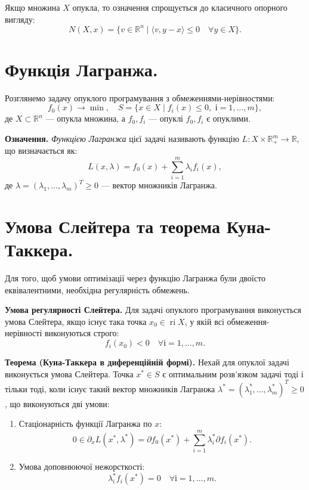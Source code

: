 \documentclass[12pt,a4paper]{extarticle}
\numberwithin{section}{part}
\begin{document}
Якщо множина $X$ опукла, то означення спрощується до класичного опорного вигляду:
$$
N(X, x) = \{ v \in \mathbb{R}^n \mid \langle v, y - x \rangle \leq 0 \quad \forall y \in X \}.
$$

\section{Функція Лагранжа.}
Розглянемо задачу опуклого програмування з обмеженнями-нерівностями:
$$
f_0(x) \to \min, \quad S = \{ x \in X \mid f_i(x) \leq 0,\,\, і = 1, \dots, m \},
$$
де $X \subset \mathbb{R}^n$ --- опукла множина, а $f_0, f_i$ --- опуклі $f_0, f_i$ є опуклими.

\textbf{Означення.} \textit{Функцією Лагранжа} цієї задачі називають функцію $L: X \times \mathbb{R}_+^m \to \mathbb{R}$, що визначається як:
$$
L(x, \lambda) = f_0(x) + \sum_{i=1}^m \lambda_i f_i(x),
$$
де $\lambda = (\lambda_1, \dots, \lambda_m)^T \geq 0$ --- вектор множників Лагранжа.

\section{Умова Слейтера та теорема Куна-Таккера.}
Для того, щоб умови оптимізації через функцію Лагранжа були двоїсто еквівалентними, необхідна регулярність обмежень.

\textbf{Умова регулярності Слейтера.} Для задачі опуклого програмування виконується умова Слейтера, якщо існує така точка $x_0 \in \operatorname{ri} X$, у якій всі обмеження-нерівності виконуються строго:
$$
f_i(x_0) < 0 \quad \forall і = 1, \dots, m.
$$

\textbf{Теорема (Куна-Таккера в диференційній формі).} Нехай для опуклої задачі виконується умова Слейтера. Точка $x^* \in S$ є оптимальним розв'язком задачі тоді і тільки тоді, коли існує такий вектор множників Лагранжа $\lambda^* = (\lambda^*_1, \dots, \lambda^*_m)^T \geq 0$, що виконуються дві умови:
\begin{enumerate}
    \item Стаціонарність функції Лагранжа по $x$:
    $$
    0 \in \partial_x L(x^*, \lambda^*) = \partial f_0(x^*) + \sum_{i=1}^m \lambda^*_i \partial f_i(x^*).
    $$
    \item Умова доповнюючої нежорсткості:
    $$
    \lambda^*_i f_i(x^*) = 0 \quad \forall і = 1, \dots, m.
    $$
\end{enumerate}


\end{document}
